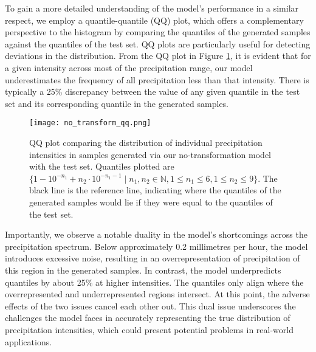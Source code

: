 \documentclass[ oneside,%
                    author={George Herbert},
                    degree={MSci},
                     title={Diffusion Models for Time-Evolving Precipitation Fields},
                  subtitle={}]{dissertation}
\begin{document}
To gain a more detailed understanding of the model's performance in a similar respect, we employ a quantile-quantile (QQ) plot, which offers a complementary perspective to the histogram by comparing the quantiles of the generated samples against the quantiles of the test set. QQ plots are particularly useful for detecting deviations in the distribution. From the QQ plot in Figure \ref{fig:no_transform_qq}, it is evident that for a given intensity across most of the precipitation range, our model underestimates the frequency of all precipitation less than that intensity. There is typically a 25\% discrepancy between the value of any given quantile in the test set and its corresponding quantile in the generated samples.

\begin{figure}[htbp]
      \centering
      \texttt{[image: no\_transform\_qq.png]}
      \caption{QQ plot comparing the distribution of individual precipitation intensities in samples generated via our no-transformation model with the test set. Quantiles plotted are $\{1 - 10^{-n_1} + n_2 \cdot 10^{-n_1 - 1}\mid n_1,n_2\in \mathbb{N}, 1 \le n_1 \le 6, 1 \le n_2 \le 9\}$. The black line is the reference line, indicating where the quantiles of the generated samples would lie if they were equal to the quantiles of the test set.}
      \label{fig:no_transform_qq}
\end{figure}

Importantly, we observe a notable duality in the model's shortcomings across the precipitation spectrum. Below approximately 0.2 millimetres per hour, the model introduces excessive noise, resulting in an overrepresentation of precipitation of this region in the generated samples. In contrast, the model underpredicts quantiles by about 25\% at higher intensities. The quantiles only align where the overrepresented and underrepresented regions intersect. At this point, the adverse effects of the two issues cancel each other out. This dual issue underscores the challenges the model faces in accurately representing the true distribution of precipitation intensities, which could present potential problems in real-world applications.
\end{document}
